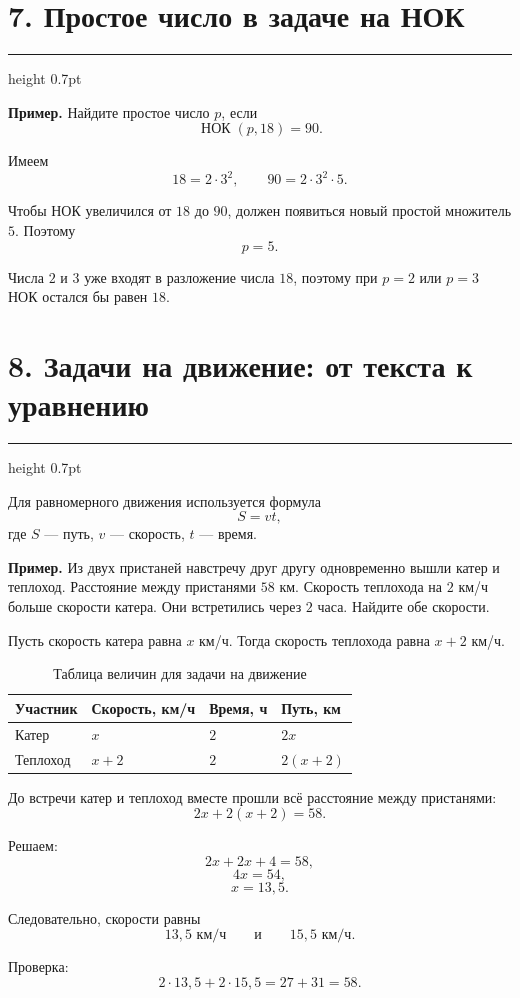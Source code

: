 \documentclass[a4paper,12pt]{article}
\newcommand{\sectionline}{%
  \par\vspace{0.1em}%
  {\color{accent}\hrule height 0.7pt}%
  \vspace{0.55em}}
\newcommand{\LCMru}{\mathop{\text{НОК}}\nolimits}
\begin{document}
\section*{7. Простое число в задаче на НОК}
\sectionline

\textbf{Пример.}
Найдите простое число $p$, если
\[
\LCMru(p,18)=90.
\]

Имеем
\[
18=2\cdot3^2,
\qquad
90=2\cdot3^2\cdot5.
\]

Чтобы НОК увеличился от $18$ до $90$,
должен появиться новый простой множитель $5$.
Поэтому
\[
p=5.
\]

Числа $2$ и $3$ уже входят
в разложение числа $18$,
поэтому при $p=2$ или $p=3$
НОК остался бы равен $18$.

\section*{8. Задачи на движение: от текста к уравнению}
\sectionline

Для равномерного движения используется формула
\[
S=vt,
\]
где $S$ --- путь,
$v$ --- скорость,
$t$ --- время.

\textbf{Пример.}
Из двух пристаней навстречу друг другу
одновременно вышли катер и теплоход.
Расстояние между пристанями $58$ км.
Скорость теплохода на $2$ км/ч
больше скорости катера.
Они встретились через $2$ часа.
Найдите обе скорости.

Пусть скорость катера равна $x$ км/ч.
Тогда скорость теплохода равна
$x+2$ км/ч.

\begin{table}[ht]
\centering
\caption{Таблица величин для задачи на движение}
\begin{tabularx}{0.92\linewidth}{@{}lXXX@{}}
\toprule
Участник
&
Скорость, км/ч
&
Время, ч
&
Путь, км
\\
\midrule
Катер
&
$x$
&
$2$
&
$2x$
\\
Теплоход
&
$x+2$
&
$2$
&
$2(x+2)$
\\
\bottomrule
\end{tabularx}
\end{table}

До встречи катер и теплоход
вместе прошли всё расстояние между пристанями:
\[
2x+2(x+2)=58.
\]

Решаем:
\[
2x+2x+4=58,
\]
\[
4x=54,
\]
\[
x=13{,}5.
\]

Следовательно, скорости равны
\[
13{,}5\text{ км/ч}
\qquad\text{и}\qquad
15{,}5\text{ км/ч}.
\]

Проверка:
\[
2\cdot13{,}5
+
2\cdot15{,}5
=
27+31
=
58.
\]
\end{document}
